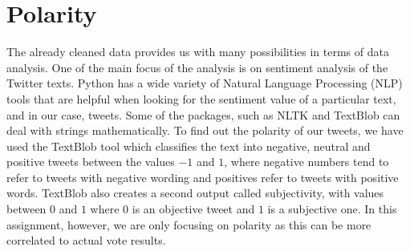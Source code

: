 \documentclass{article}
\begin{document}

      
  \section{Polarity}
  The already cleaned data provides us with many possibilities in
  terms of data analysis. One of the main focus of the analysis is on
  sentiment analysis of the Twitter texts. Python has a wide variety
  of Natural Language Processing (NLP) tools that are helpful when
  looking for the sentiment value of a particular text, and in our
  case, tweets. Some of the packages, such as NLTK and TextBlob can
  deal with strings mathematically. To find out the polarity of our
  tweets, we have used the TextBlob tool which classifies the text
  into negative, neutral and positive tweets between the values $-1$ and
  $1$, where negative numbers tend to refer to tweets with negative
  wording and positives refer to tweets with positive words. TextBlob
  also creates a second output called subjectivity, with values
  between $0$ and $1$  where $0$ is an objective tweet and $1$ is a subjective
  one. In this assignment, however, we are only focusing on polarity
  as this can be more correlated to actual vote results.%
\end{document}
